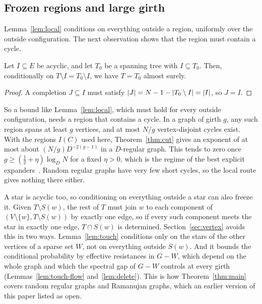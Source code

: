 \subsection{Frozen regions and large girth}

Lemma~\ref{lem:local} conditions on everything outside a region, uniformly over the outside configuration. The next observation shows that the region must contain a cycle.

\begin{proposition}\label{prop:frozen}
Let $I\subseteq E$ be acyclic, and let $T_0$ be a spanning tree with $I\subseteq T_0$. Then, conditionally on $T\setminus I=T_0\setminus I$, we have $T=T_0$ almost surely.
\end{proposition}

\begin{proof}
A completion $J\subseteq I$ must satisfy $\lvert J\rvert=N-1-\lvert T_0\setminus I\rvert=\lvert I\rvert$, so $J=I$.
\end{proof}

So a bound like Lemma~\ref{lem:local}, which must hold for every outside configuration, needs a region that contains a cycle. In a graph of girth $g$, any such region spans at least $g$ vertices, and at most $N/g$ vertex-disjoint cycles exist. With the regions $I(C)$ used here, Theorem~\ref{thm:cut} gives an exponent of at most about $(N/g)D^{-2(g-1)}$ in a $D$-regular graph. This tends to zero once $g\ge(\frac12+\eta)\log_DN$ for a fixed $\eta>0$, which is the regime of the best explicit expanders~\cite{LPS88}. Random regular graphs have very few short cycles, so the local route gives nothing there either.

A star is acyclic too, so conditioning on everything outside a star can also freeze it. Given $T\setminus S(w)$, the rest of $T$ must join $w$ to each component of $(V\setminus\{w\},T\setminus S(w))$ by exactly one edge, so if every such component meets the star in exactly one edge, $T\cap S(w)$ is determined. Section~\ref{sec:vertex} avoids this in two ways. Lemma~\ref{lem:touch} conditions only on the stars of the other vertices of a sparse set $W$, not on everything outside $S(w)$. And it bounds the conditional probability by effective resistances in $G-W$, which depend on the whole graph and which the spectral gap of $G-W$ controls at every girth (Lemmas~\ref{lem:touch-flow} and~\ref{lem:delete}). This is how Theorem~\ref{thm:main} covers random regular graphs and Ramanujan graphs, which an earlier version of this paper listed as open.

